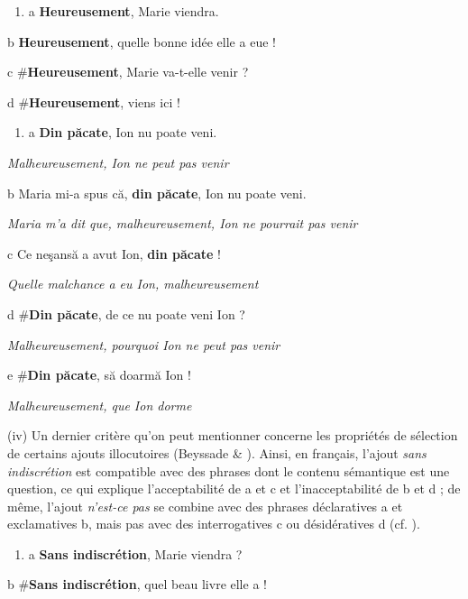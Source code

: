 \begin{enumerate}
\item \label{bkm:Ref299273432}a  \textbf{Heureusement}, Marie viendra.


\end{enumerate}
  b  \textbf{Heureusement}, quelle bonne idée elle a eue !

  c  \#\textbf{Heureusement}, Marie va-t-elle venir ?

  d  \#\textbf{Heureusement}, viens ici !


\begin{enumerate}
\item \label{bkm:Ref299273362}a  \textbf{Din păcate}, Ion nu poate veni.


\end{enumerate}
{\itshape
Malheureusement, Ion ne peut pas venir}

  b  Maria mi-a spus că, \textbf{din păcate}, Ion nu poate veni.

{\itshape
Maria m'a dit que, malheureusement, Ion ne pourrait pas venir}

  c  Ce neşansă a avut Ion, \textbf{din păcate} !

{\itshape
Quelle malchance a eu Ion, malheureusement}

  d  \#\textbf{Din păcate}, de ce nu poate veni Ion ?

{\itshape
Malheureusement, pourquoi Ion ne peut pas venir~}

  e  \#\textbf{Din păcate}, să doarmă Ion !

{\itshape
Malheureusement, que Ion dorme~}

(iv) Un dernier critère qu'on peut mentionner concerne les propriétés de sélection de certains ajouts illocutoires (Beyssade \& \citet{Marandin2006}). Ainsi, en français, l'ajout \textit{sans indiscrétion} est compatible avec des phrases dont le contenu sémantique est une question, ce qui explique l'acceptabilité de a et c et l'inacceptabilité de b et d ; de même, l'ajout \textit{n'est-ce pas} se combine avec des phrases déclaratives a et exclamatives b, mais pas avec des interrogatives c ou désidératives d (cf. \citet{Laurens2007}). 


\begin{enumerate}
\item \label{bkm:Ref299274566}a  \textbf{Sans indiscrétion}, Marie viendra ?


\end{enumerate}
  b  \#\textbf{Sans indiscrétion}, quel beau livre elle a ! 

